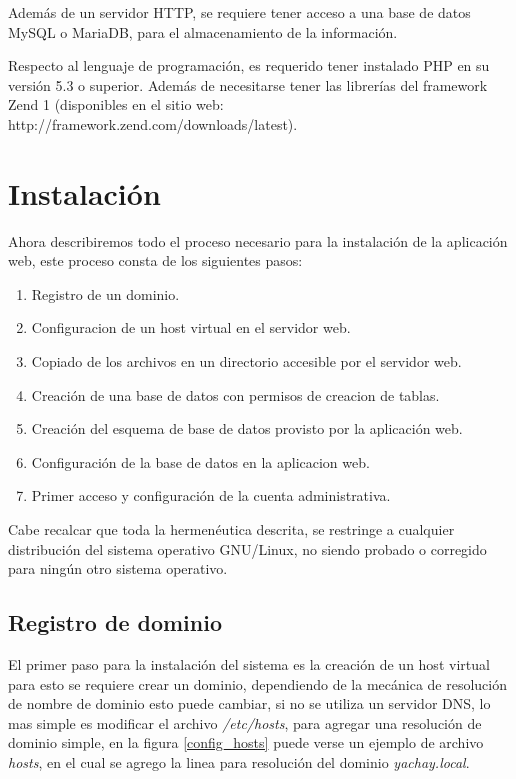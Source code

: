 Además de un servidor HTTP, se requiere tener acceso a una base de datos MySQL o
MariaDB, para el almacenamiento de la información.

Respecto al lenguaje de programación, es requerido tener instalado PHP en su
versión 5.3 o superior. Además de necesitarse tener las librerías del framework
Zend 1 (disponibles en el sitio web:
http://framework.zend.com/downloads/latest).

\section{Instalación}
Ahora describiremos todo el proceso necesario para la instalación de la
aplicación web, este proceso consta de los siguientes pasos:

\begin{enumerate}
\item Registro de un dominio.
\item Configuracion de un host virtual en el servidor web.
\item Copiado de los archivos en un directorio accesible por el servidor web.
\item Creación de una base de datos con permisos de creacion de tablas.
\item Creación del esquema de base de datos provisto por la aplicación web.
\item Configuración de la base de datos en la aplicacion web.
\item Primer acceso y configuración de la cuenta administrativa.
\end{enumerate}

Cabe recalcar que toda la hermenéutica descrita, se restringe a cualquier
distribución del sistema operativo GNU/Linux, no siendo probado o corregido
para ningún otro sistema operativo.

\subsection{Registro de dominio}
El primer paso para la instalación del sistema es la creación de un host virtual
para esto se requiere crear un dominio, dependiendo de la mecánica de resolución
de nombre de dominio esto puede cambiar, si no se utiliza un servidor DNS, lo
mas simple es modificar el archivo \emph{/etc/hosts}, para agregar una
resolución de dominio simple, en la figura \ref{config_hosts} puede verse un
ejemplo de archivo \emph{hosts}, en el cual se agrego la linea para resolución
del dominio \emph{yachay.local}.

